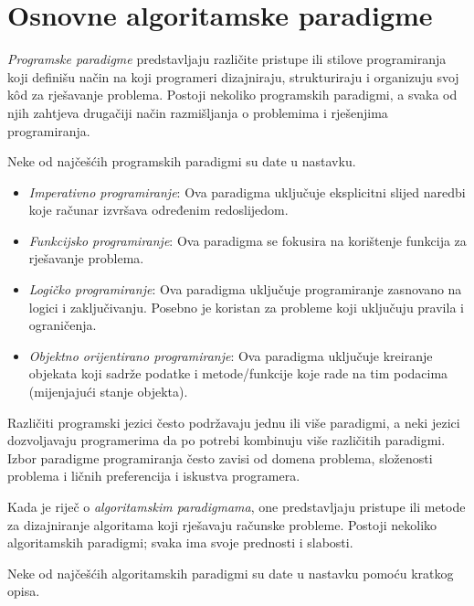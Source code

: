 \chapter{Osnovne algoritamske paradigme}

\textit{Programske paradigme} predstavljaju različite pristupe ili stilove  programiranja koji definišu način na koji programeri dizajniraju, strukturiraju i organizuju  svoj k\^od za rješavanje problema. Postoji nekoliko programskih paradigmi, a svaka od njih zahtjeva  drugačiji način razmišljanja o problemima i rješenjima programiranja.

Neke od najčešćih programskih paradigmi su date u nastavku. 

\begin{itemize}
	\item \textit{Imperativno programiranje}: Ova paradigma uključuje %
	 eksplicitni slijed naredbi koje računar izvršava određenim redoslijedom.
	\item \textit{Funkcijsko programiranje}: Ova paradigma se fokusira na korištenje funkcija za rješavanje problema.  %
	\item \textit{Logičko programiranje}: Ova paradigma uključuje programiranje zasnovano na logici i zaključivanju. Posebno je koristan za probleme koji uključuju pravila i ograničenja.
	\item \textit{Objektno orijentirano programiranje}: Ova paradigma uključuje kreiranje objekata koji sadrže  podatke i metode/funkcije koje rade na tim podacima (mijenjajući stanje objekta).
\end{itemize}


Različiti programski jezici često podržavaju jednu ili više paradigmi, a neki jezici dozvoljavaju programerima da po potrebi kombinuju  više različitih  paradigmi. Izbor paradigme programiranja često zavisi od domena problema, složenosti problema i ličnih preferencija i iskustva programera.

Kada je riječ o \textit{algoritamskim paradigmama}, one predstavljaju  pristupe ili metode za dizajniranje algoritama koji rješavaju   računske probleme. Postoji nekoliko algoritamskih paradigmi; svaka  ima svoje prednosti i slabosti. 

Neke od najčešćih algoritamskih paradigmi su date u nastavku pomoću kratkog opisa. 

